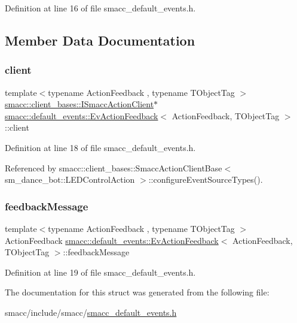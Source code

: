 Definition at line 16 of file smacc\+\_\+default\+\_\+events.\+h.



\subsection{Member Data Documentation}
\mbox{\label{structsmacc_1_1default__events_1_1EvActionFeedback_a356e106d4c54e12dc81a0f3063ecff4a}} 
\subsubsection{\texorpdfstring{client}{client}}
{\footnotesize\ttfamily template$<$typename Action\+Feedback , typename T\+Object\+Tag $>$ \\
\hyperlink{classsmacc_1_1client__bases_1_1ISmaccActionClient}{smacc\+::client\+\_\+bases\+::\+I\+Smacc\+Action\+Client}$\ast$ \hyperlink{structsmacc_1_1default__events_1_1EvActionFeedback}{smacc\+::default\+\_\+events\+::\+Ev\+Action\+Feedback}$<$ Action\+Feedback, T\+Object\+Tag $>$\+::client}



Definition at line 18 of file smacc\+\_\+default\+\_\+events.\+h.



Referenced by smacc\+::client\+\_\+bases\+::\+Smacc\+Action\+Client\+Base$<$ sm\+\_\+dance\+\_\+bot\+::\+L\+E\+D\+Control\+Action $>$\+::configure\+Event\+Source\+Types().

\mbox{\label{structsmacc_1_1default__events_1_1EvActionFeedback_aa04da2789df313666c6aa9480dc8287d}} 
\subsubsection{\texorpdfstring{feedback\+Message}{feedbackMessage}}
{\footnotesize\ttfamily template$<$typename Action\+Feedback , typename T\+Object\+Tag $>$ \\
Action\+Feedback \hyperlink{structsmacc_1_1default__events_1_1EvActionFeedback}{smacc\+::default\+\_\+events\+::\+Ev\+Action\+Feedback}$<$ Action\+Feedback, T\+Object\+Tag $>$\+::feedback\+Message}



Definition at line 19 of file smacc\+\_\+default\+\_\+events.\+h.



The documentation for this struct was generated from the following file\+:\begin{DoxyCompactItemize}
\item 
smacc/include/smacc/\hyperlink{smacc__default__events_8h}{smacc\+\_\+default\+\_\+events.\+h}\end{DoxyCompactItemize}

